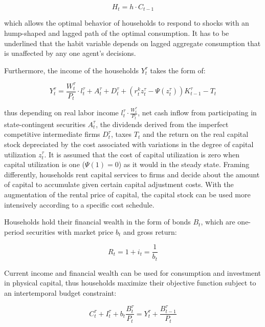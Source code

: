 \documentclass{pracamgr}
\numberwithin{equation}{section}
\begin{document}
\begin{equation}
H_{t} = h \cdot C_{t-1}
\end{equation}

which allows the optimal behavior of households to respond to shocks with an hump-shaped and lagged path of the optimal consumption. It has to be underlined that the habit variable depends on lagged aggregate consumption that is unaffected by any one agent's decisions.

Furthermore, the income of the households $Y_{t}^{\tau}$ takes the form of:

\begin{equation}
Y_{t}^{\tau} = \frac{W_{t}^{\tau}}{P_{t}} \cdot l_{t}^{\tau} + A_{t}^{\tau} + D_{t}^{\tau} + \left( r_{t}^{k} z_{t}^{\tau} - \Psi(z_{t}^{\tau}) \right) K_{t-1}^{\tau} - T_{t}
\end{equation}

thus depending on real labor income $l_{t}^{\tau} \cdot \frac{W_{t}^{\tau}}{P_{t}} $, net cash inflow from participating in state-contingent securities $A_{t}^{\tau}$, the dividends derived from the imperfect competitive intermediate firms $D_{t}^{\tau}$, taxes $T_{t}$ and the return on the real capital stock depreciated by the cost associated with variations in the degree of capital utilization $z_{t}^{\tau}$. It is assumed that the cost of capital utilization is zero when capital utilization is one ($\Psi(1) = 0$) as it would in the steady state. Framing differently, households rent capital services to firms and decide about the amount of capital to accumulate given certain capital adjustment costs. With the augmentation of the rental price of capital, the capital stock can be used more intensively according to a specific cost schedule.

Households hold their financial wealth in the form of bonds $B_{t}$, which are one-period securities with market price $b_{t}$ and gross return:

\begin{equation}
R_{t} = 1 + i_{t}= \frac{1}{b_{t}}
\end{equation}

Current income and financial wealth can be used for consumption and investment in physical capital, thus households maximize their objective function subject to an intertemporal budget constraint:

\begin{equation}
C_{t}^{\tau} + I_{t}^{\tau} + b_{t} \frac{B_{t}^{\tau}}{P_{t}} = Y_{t}^{\tau} + \frac{B_{t-1}^{\tau}}{P_{t}}
\end{equation}
\end{document}
